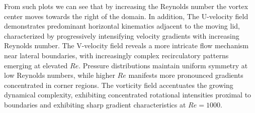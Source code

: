 \documentclass{article}
\begin{document}
From such plots we can see that by increasing the Reynolds number the vortex center moves towards the right of the domain. In addition, The U-velocity field demonstrates predominant horizontal kinematics adjacent to the moving lid, 
characterized by progressively intensifying velocity gradients with increasing Reynolds number. The V-velocity field reveals a more intricate flow mechanism near lateral boundaries, with increasingly complex recirculatory patterns 
emerging at elevated $Re$. Pressure distributions maintain uniform symmetry at low Reynolds numbers, while higher $Re$ manifests more pronounced gradients concentrated in corner regions.
The vorticity field accentuates the growing dynamical complexity, exhibiting concentrated rotational intensities proximal to boundaries and exhibiting sharp gradient characteristics at $Re = 1000$.
\end{document}
